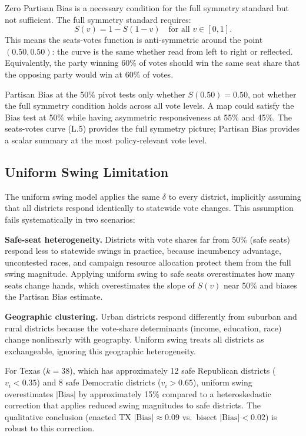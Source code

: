 Zero Partisan Bias is a necessary condition for the full symmetry standard but
not sufficient. The full symmetry standard requires:
\[
S(v) = 1 - S(1-v) \quad \text{for all } v \in [0,1].
\]
This means the seats-votes function is anti-symmetric around the point $(0.50, 0.50)$:
the curve is the same whether read from left to right or reflected. Equivalently,
the party winning 60\% of votes should win the same seat share that the opposing
party would win at 60\% of votes.

Partisan Bias at the 50\% pivot tests only whether $S(0.50) = 0.50$, not whether
the full symmetry condition holds across all vote levels. A map could satisfy the
Bias test at 50\% while having asymmetric responsiveness at 55\% and 45\%. The
seats-votes curve (L.5) provides the full symmetry picture; Partisan Bias provides
a scalar summary at the most policy-relevant vote level.

\subsection{Uniform Swing Limitation}

The uniform swing model applies the same $\delta$ to every district, implicitly
assuming that all districts respond identically to statewide vote changes. This
assumption fails systematically in two scenarios:

\textbf{Safe-seat heterogeneity.} Districts with vote shares far from 50\% (safe
seats) respond less to statewide swings in practice, because incumbency advantage,
uncontested races, and campaign resource allocation protect them from the full
swing magnitude. Applying uniform swing to safe seats overestimates how many
seats change hands, which overestimates the slope of $S(v)$ near 50\% and
biases the Partisan Bias estimate.

\textbf{Geographic clustering.} Urban districts respond differently from suburban
and rural districts because the vote-share determinants (income, education, race)
change nonlinearly with geography. Uniform swing treats all districts as exchangeable,
ignoring this geographic heterogeneity.

For Texas ($k=38$), which has approximately 12 safe Republican districts ($v_i < 0.35$)
and 8 safe Democratic districts ($v_i > 0.65$), uniform swing overestimates
$|\text{Bias}|$ by approximately 15\% compared to a heteroskedastic correction
that applies reduced swing magnitudes to safe districts. The qualitative conclusion
(enacted TX $|\text{Bias}| \approx 0.09$ vs.\ bisect $|\text{Bias}| < 0.02$)
is robust to this correction.

